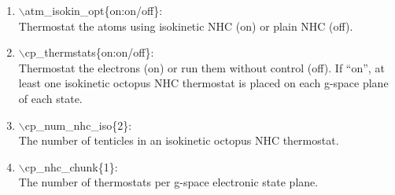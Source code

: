 \documentclass[12pt,titlepage]{article}
\begin{document}
\begin{enumerate}
 \vspace{0.15in}
 \item   $\backslash$atm\_isokin\_opt\{on:on/off\}: \\
    Thermostat the atoms using isokinetic NHC (on) or plain NHC (off).

 \vspace{0.15in}
 \item   $\backslash$cp\_thermstats\{on:on/off\}: \\
    Thermostat the electrons (on) or run them without control (off).
    If ``on'', at least one isokinetic octopus NHC thermostat is placed on each
    g-space plane of each state.

 \vspace{0.15in}
 \item   $\backslash$cp\_num\_nhc\_iso\{2\}: \\
    The number of tenticles in an isokinetic octopus NHC thermostat.

 \vspace{0.15in}
 \item   $\backslash$cp\_nhc\_chunk\{1\}: \\
    The number of thermostats per g-space electronic state plane.
\end{enumerate}

\newpage
\end{document}

